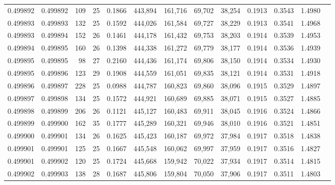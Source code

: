 \begin{tabular}{rrrrrrrrrrrrr}
0.499892 & 0.499892 & 109 &  25 &                                     0.1866 & 443,894 & 161,716 &  69,702 &  38,254 & 0.1913 & 0.3543 & 1.4980 \\
0.499893 & 0.499893 & 132 &  25 &                                     0.1592 & 444,026 & 161,584 &  69,727 &  38,229 & 0.1913 & 0.3541 & 1.4968 \\
0.499893 & 0.499894 & 152 &  26 &                                     0.1461 & 444,178 & 161,432 &  69,753 &  38,203 & 0.1914 & 0.3539 & 1.4953 \\
0.499894 & 0.499895 & 160 &  26 &                                     0.1398 & 444,338 & 161,272 &  69,779 &  38,177 & 0.1914 & 0.3536 & 1.4939 \\
0.499895 & 0.499895 &  98 &  27 &                                     0.2160 & 444,436 & 161,174 &  69,806 &  38,150 & 0.1914 & 0.3534 & 1.4930 \\
0.499895 & 0.499896 & 123 &  29 &                                     0.1908 & 444,559 & 161,051 &  69,835 &  38,121 & 0.1914 & 0.3531 & 1.4918 \\
0.499896 & 0.499897 & 228 &  25 &                                     0.0988 & 444,787 & 160,823 &  69,860 &  38,096 & 0.1915 & 0.3529 & 1.4897 \\
0.499897 & 0.499898 & 134 &  25 &                                     0.1572 & 444,921 & 160,689 &  69,885 &  38,071 & 0.1915 & 0.3527 & 1.4885 \\
0.499898 & 0.499899 & 206 &  26 &                                     0.1121 & 445,127 & 160,483 &  69,911 &  38,045 & 0.1916 & 0.3524 & 1.4866 \\
0.499899 & 0.499900 & 162 &  35 &                                     0.1777 & 445,289 & 160,321 &  69,946 &  38,010 & 0.1916 & 0.3521 & 1.4851 \\
0.499900 & 0.499901 & 134 &  26 &                                     0.1625 & 445,423 & 160,187 &  69,972 &  37,984 & 0.1917 & 0.3518 & 1.4838 \\
0.499901 & 0.499901 & 125 &  25 &                                     0.1667 & 445,548 & 160,062 &  69,997 &  37,959 & 0.1917 & 0.3516 & 1.4827 \\
0.499901 & 0.499902 & 120 &  25 &                                     0.1724 & 445,668 & 159,942 &  70,022 &  37,934 & 0.1917 & 0.3514 & 1.4815 \\
0.499902 & 0.499903 & 138 &  28 &                                     0.1687 & 445,806 & 159,804 &  70,050 &  37,906 & 0.1917 & 0.3511 & 1.4803 \\

\end{tabular}
